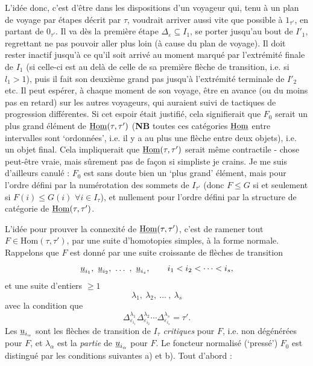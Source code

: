 
L'idée donc, c'est d'être dans les dispositions d'un voyageur qui, tenu à un plan de voyage par étapes décrit par $\tau$, voudrait arriver aussi vite que possible à $1_{\tau'}$, en partant de $0_{\tau'}$. Il va dès la première étape $\Delta_\varepsilon\subseteq I_1$, se porter jusqu'au bout de $I'_1$, regrettant ne pas pouvoir aller plus loin (à cause du plan de voyage). Il doit rester inactif jusqu'à ce qu'il soit arrivé au moment marqué par l'extrémité finale de $I_1$ (si celle-ci est au delà de celle de sa première flèche de transition, i.e. si $l_1>1$), puis il fait son deuxième grand pas jusqu'à l'extrémité terminale de $I'_2$ etc. Il peut espérer, à chaque moment de son voyage, être en avance (ou du moins pas en retard) sur les autres voyageurs, qui auraient suivi de tactiques de progression différentes. Si cet espoir était justifié, cela signifierait que $F_0$ serait un plus grand élément de $\underline{\mathrm{Hom}}(\tau,\tau')$ (\textbf{NB} toutes ces catégories $\underline{\mathrm{Hom}}$ entre intervalles sont ‘ordonnées’, i.e. il y a au plus une flèche entre deux objets), i.e. un objet final. Cela impliquerait que $\underline{\mathrm{Hom}}(\tau,\tau')$ serait même contractile - chose peut-être vraie, mais sûrement pas de façon si simpliste je crains. Je me suis d'ailleurs canulé : $F_0$ est sans doute bien un ‘plus grand’ élément, mais pour l'ordre défini par la numérotation des sommets de $I_{\tau'}$ (donc $F\leq G$ si et seulement si $F(i)\leq G(i)$ $\forall i\in I_\tau$), et nullement pour l'ordre défini par la structure de catégorie de $\underline{\mathrm{Hom}}(\tau,\tau')$.

L'idée pour prouver la connexité de $\underline{\mathrm{Hom}}(\tau,\tau')$, c'est de ramener tout $F\in\mathrm{Hom}(\tau,\tau')$, par une suite d'homotopies simples, à la forme normale. Rappelons que $F$ est donné par une suite croissante de flèches de transition
\[
\ul{u}_{i_1},\ \ul{u}_{i_2},\ \dots\ ,\ \ul{u}_{i_s},\qquad i_1<i_2<\cdots<i_s,
\]
et une suite d'entiers $\geq1$
\[
\lambda_1,\ \lambda_2,\ \dots\ ,\ \lambda_s
\]
avec la condition que
\[
\Delta^{\lambda_1}_{\varepsilon_{i_1}}\Delta^{\lambda_2}_{\varepsilon_{i_2}}\cdots\Delta^{\lambda_s}_{\varepsilon_{i_s}}=\tau'. \tag*{$(*)$}
\]
Les $\underline{u}_{i_\alpha}$ sont les flèches de transition de $I_\tau$ \textit{critiques} pour $F$, i.e. non dégénérées pour $F$, et $\lambda_\alpha$ est la \textit{partie} de $\underline{u}_{i_\alpha}$ pour $F$. Le foncteur normalisé (‘pressé’) $F_0$ est distingué par les conditions suivantes a) et b). Tout d'abord :

